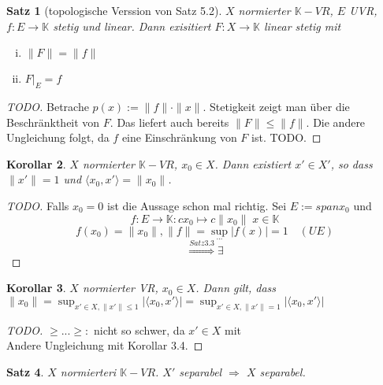 \documentclass[ngerman]{report}
\theoremstyle{plain}%
\newtheorem{thm}{Satz}[chapter]
\newtheorem{cor}[thm]{Korollar}
\theoremstyle{definition}%
\theoremstyle{myStyle}
\newcommand{\K}{\mathbb{K}}
\newcommand{\norm}[1]{\|#1\|}
\newcommand{\df}[1][]{%
	\overset{#1}{\Rightarrow}
}
\begin{document}
	\begin{thm}[topologische Verssion von Satz 5.2]
		$X$ normierter $\K-VR$, $E$ UVR, $f: E\to \K$ stetig und linear. Dann exisitiert $F : X\to \K$ linear stetig mit 
				\begin{enumerate}[(i)]
					\item $\norm{F} = \norm{f}$
					\item $F|_E = f$
				\end{enumerate}
	\end{thm}
	
	\begin{proof}[TODO]
		Betrache $p(x) := \norm{f}\cdot \norm{x}$. Stetigkeit zeigt man über die Beschränktheit von $F$. Das liefert auch bereits $\norm{F} \leq \norm{f}$. Die andere Ungleichung folgt, da $f$ eine Einschränkung von $F$ ist. TODO.
	\end{proof}

	\begin{cor}
		$X$ normierter $\K-VR$, $x_0 \in X$. Dann existiert $x' \in X'$, so dass $\norm{x'} =1$ und $\langle x_0, x' \rangle = \norm{x_0}$.
	\end{cor}

	\begin{proof}[TODO]
		Falls $x_0 = 0$ ist die Aussage schon mal richtig. Sei $E := span{x_0}$ und 
		$$f: E \to \K : cx_0 \mapsto c\norm{x_0} \; x\in \K$$ 
		$$f(x_0) = \norm{x_0}, \norm{f} = \sup_{...}|f(x)| = 1 \quad (UE)$$
		$$\df[Satz 3.3] \exists$$
	\end{proof}

	\begin{cor}
		$X$ normierter VR, $x_0 \in X$. Dann gilt, dass $\norm{x_0} = \sup_{x' \in X, \norm{x'} \leq 1}|\langle x_0, x' \rangle | = \sup_{x' \in X, \norm{x'} = 1}|\langle x_0, x' \rangle |$
	\end{cor}		

	\begin{proof}[TODO]
	 $\geq ... \geq :$ nicht so schwer, da $x' \in X$ mit  \\
		Andere Ungleichung mit Korollar 3.4.	
	\end{proof}

	\begin{thm}
	$X$ normierteri $\K-VR$. $X'$ separabel $\df$ $X$ separabel.
	\end{thm}
\end{document}
